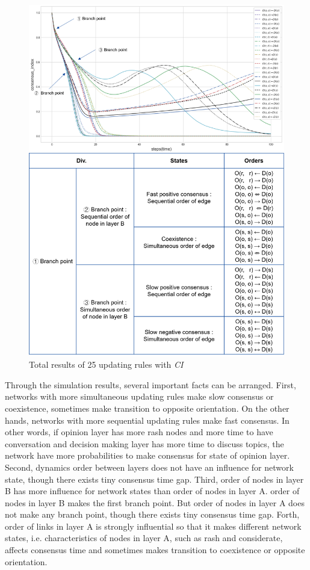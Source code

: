 \documentclass[review]{elsarticle}
\begin{document}
\begin{figure}[!htb]
	\centering
	\includegraphics[width=\hsize]{ordertotal2.png}
	\caption{Total results of 25 updating rules with \textit{CI}}
	\label{ordertotal2}
\end{figure}

Through the simulation results, several important facts can be arranged. First, networks with more simultaneous updating rules make slow consensus or coexistence, sometimes make transition to opposite orientation. On the other hands, networks with more sequential updating rules make fast consensus. In other words, if opinion layer has more rash nodes and more time to have conversation and decision making layer has more time to discuss topics, the network have more probabilities to make consensus for state of opinion layer. Second, dynamics order between layers does not have an influence for network state, though there exists tiny consensus time gap. Third, order of nodes in layer B has more influence for network states than order of nodes in layer A. order of nodes in layer B makes the first branch point. But order of nodes in layer A does not make any branch point, though there exists tiny consensus time gap. Forth, order of links in layer A is strongly influential so that it makes different network states, i.e. characteristics of nodes in layer A, such as rash and considerate, affects consensus time and sometimes makes transition to coexistence or opposite orientation. 
\end{document}

